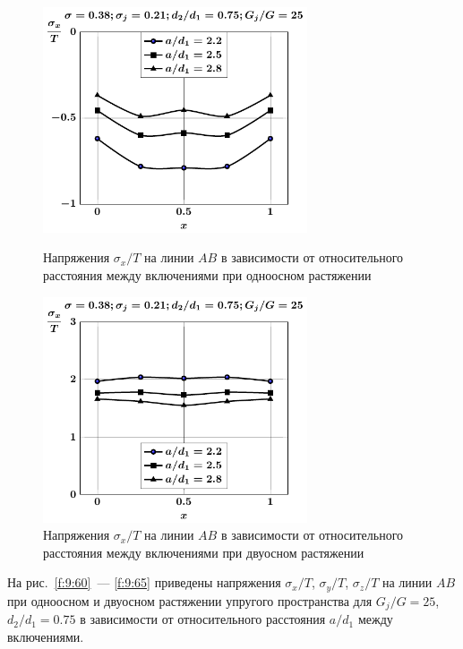 \begin{russian}
\begin{figure}[h!]
\centering\footnotesize
\parbox[b]{7.5cm}{\centering\includegraphics[width=7.8cm]{inc4-a-d75-g25-t1-sig_x.pdf}
\caption{Напряжения $\sigma_x/T$ на линии $AB$ в зависимости от относительного расстояния между включениями при одноосном растяжении
\label{f:9:60}}}\hfil\hfil
\parbox[b]{7.5cm}{\centering\includegraphics[width=7.8cm]{inc4-a-d75-g25-t2-sig_x.pdf}
\caption{Напряжения $\sigma_x/T$ на линии $AB$ в зависимости от относительного расстояния между включениями при двуосном растяжении
\label{f:9:61}}}
\end{figure}

На рис.~\ref{f:9:60}~--- \ref{f:9:65} приведены напряжения $\sigma_x/T$, $\sigma_y/T$, $\sigma_z/T$ на линии $AB$ при одноосном и двуосном растяжении упругого пространства для $G_j/G=25$, $d_2/d_1=0.75$ в зависимости от относительного расстояния $a/d_1$ между включениями.


\end{russian}
